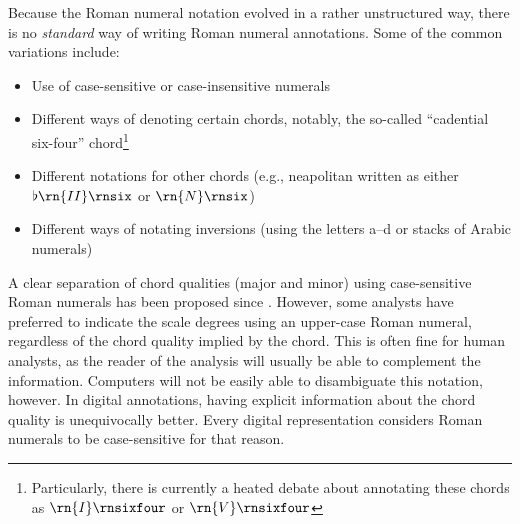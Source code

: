 

Because the Roman numeral notation evolved in a rather
unstructured way, there is no \emph{standard} way of writing
Roman numeral annotations. 
Some of the common variations include:

\begin{itemize}
    \item Use of case-sensitive or case-insensitive numerals
    \item Different ways of denoting certain chords,
    notably, the so-called ``cadential six-four''
    chord\footnote{Particularly, there is currently a heated
    debate about annotating these chords as
    $\rn{I}\rnsixfour$ or $\rn{V}\rnsixfour$}
    \item Different notations for other chords (e.g.,
    \gls{neapolitan} written as either $\flat\rn{II}\rnsix$
    or $\rn{N}\rnsix$)
    \item Different ways of notating inversions (using the
    letters a--d or stacks of Arabic numerals)
\end{itemize}

A clear separation of chord qualities (major and minor)
using case-sensitive Roman numerals has been proposed since
\textcite{weber1818versuch}. However, some analysts have
preferred to indicate the scale degrees using an upper-case
Roman numeral, regardless of the chord quality implied by
the chord. This is often fine for human analysts, as the
reader of the analysis will usually be able to complement
the information. Computers will not be easily able to
disambiguate this notation, however. In digital annotations,
having explicit information about the chord quality is
unequivocally better. Every digital representation considers
Roman numerals to be case-sensitive for that reason.

